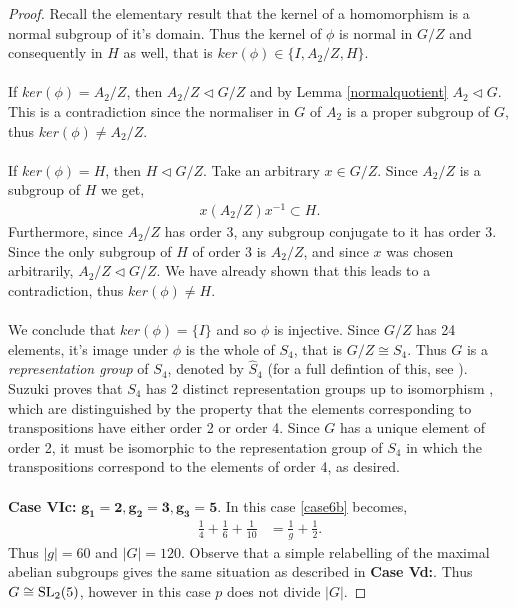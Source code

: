\begin{proof}
Recall the elementary result that the kernel of a homomorphism is a normal subgroup of it's domain. Thus the kernel of $\phi$ is normal in $G / Z$ and consequently in $H$ as well, that is $ker(\phi) \in\{ I , A_2 / Z, H \}$. \\
\\
If $ker(\phi) = A_2 / Z$, then $A_2 / Z \vartriangleleft G / Z$ and by Lemma \ref{normalquotient} $A_2 \vartriangleleft G$. This is a contradiction since the normaliser in $G$ of $A_2$ is a proper subgroup of $G$, thus $ker(\phi) \neq A_2 / Z$. \\
\\
If $ker(\phi) = H$, then $H \vartriangleleft G / Z$. Take an arbitrary $x \in G / Z$. Since $A_2 / Z$ is a subgroup of $H$ we get,
\begin{align*} x (A_2 / Z) x^{-1} \subset H.
\end{align*}
Furthermore, since $A_2 / Z$ has order 3, any subgroup conjugate to it has order 3. Since the only subgroup of $H$ of order 3 is $A_2 / Z$, and since $x$ was chosen arbitrarily, $A_2 / Z \vartriangleleft G / Z$. We have already shown that this leads to a contradiction, thus $ker(\phi) \neq H$. \\
\\
We conclude that $ker(\phi) = \{ I \}$ and so $\phi$ is injective. Since $G / Z$ has 24 elements, it's image under $\phi$ is the whole of $S_4$, that is $G / Z \cong S_4$. Thus $G$ is a \textit{representation group} of $S_4$, denoted by $\widehat{S}_4$ (for a full defintion of this, see \cite{suzuki}). Suzuki proves that $S_4$ has 2 distinct representation groups up to isomorphism \cite[p.301]{suzuki}, which are distinguished by the property that the elements corresponding to transpositions have either order 2 or order 4. Since $G$ has a unique element of order 2, it must be isomorphic to the representation group of $S_4$ in which the transpositions correspond to the elements of order 4, as desired.\\
\\
 \space \textbf{Case VIc:} $\pmb{g_1 = 2, g_2 = 3, g_3 = 5}$.  In this case \eqref{case6b} becomes,
\begin{align*} \frac{1}{4} + \frac{1}{6} + \frac{1}{10} &= \frac{1}{g} + \frac{1}{2}.
\end{align*}
Thus $|g| = 60$ and $|G| = 120$. Observe that a simple relabelling of the maximal abelian subgroups gives the same situation as described in \textbf{Case Vd:}. Thus $G \cong \operatorname{SL}_2(5)$, however in this case $p$ does not divide $|G|$.

\end{proof}

